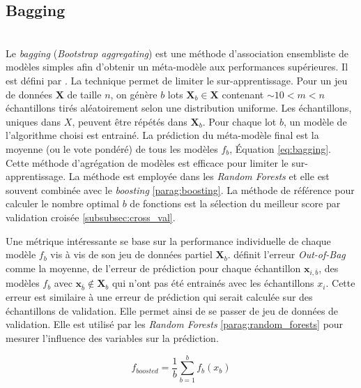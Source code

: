 
\subsection{Bagging}\mbox{\label{parag:bagging}} \\
Le \textit{bagging} (\textit{\emph{B}ootstrap \emph{agg}regat\emph{ing}}) est une méthode d'association ensembliste de modèles simples afin d'obtenir un méta-modèle aux performances supérieures.
Il est défini par \citeauthor{breiman_bagging_1996} \cite{breiman_bagging_1996}.
La technique permet de limiter le sur-apprentissage.
Pour un jeu de données $\mathbf{X}$ de taille $n$, on génère $b$ lots $\mathbf{X}_b \in \mathbf{X}$ contenant $\sim 10 < m < n$ échantillons tirés aléatoirement selon une distribution uniforme.
Les échantillons, uniques dans $X$, peuvent être répétés dans $\mathbf{X}_b$.
Pour chaque lot $b$, un modèle de l'algorithme choisi est entrainé.
La prédiction du méta-modèle final est la moyenne (ou le vote pondéré) de tous les modèles $f_b$, Équation \ref{eq:bagging}.
Cette méthode d'agrégation de modèles est efficace pour limiter le sur-apprentissage.
La méthode est employée dans les \textit{Random Forests} et elle est souvent combinée avec le \textit{boosting} \ref{parag:boosting}.
La méthode de référence pour calculer le nombre optimal $b$ de fonctions est la sélection du meilleur score par validation croisée \ref{subsubsec:cross_val}.

Une métrique intéressante se base sur la performance individuelle de chaque modèle $f_b$ vis à vis de son jeu de données partiel $\mathbf{X}_b$.
\citeauthor{breiman_bagging_1996} \cite{breiman_bagging_1996} définit l'erreur \textit{Out-of-Bag} comme la moyenne, de l'erreur de prédiction pour chaque échantillon $\mathbf{x}_{i,\bar{b}}$, des modèles $f_b$ avec $ \mathbf{x}_{\bar{b}} \notin \mathbf{X}_b$ qui n'ont pas été entrainés avec les échantillons $x_i$.
Cette erreur est similaire à une erreur de prédiction qui serait calculée sur des échantillons de validation.
Elle permet ainsi de se passer de jeu de données de validation.
Elle est utilisé par les \textit{Random Forests} \ref{parag:random_forests} pour mesurer l'influence des variables sur la prédiction.

\begin{equation} \label{eq:bagging}
f_{boosted} = \frac{1}{b} \sum_{b=1}^{b} f_{b}\left(x_b\right)
\end{equation}

